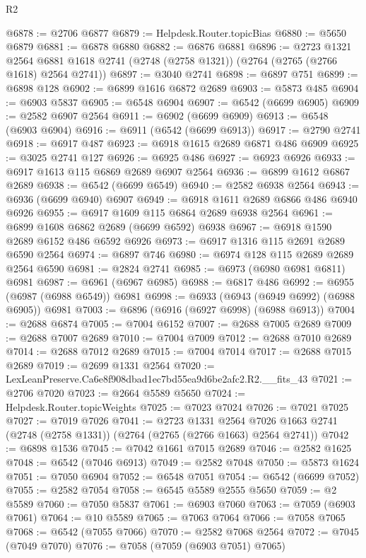 \begin{lexlean}{R2}
\begin{coremodule}
@6878 := @2706 @6877
@6879 := Helpdesk.Router.topicBias
@6880 := @5650 @6879
@6881 := @6878 @6880
@6882 := @6876 @6881
@6896 := @2723
    @1321
    @2564
    @6881
    @1618
    @2741
    (@2748 (@2758 @1321))
    (@2764 (@2765 (@2766 @1618) @2564 @2741))
@6897 := @3040 @2741
@6898 := @6897 @751
@6899 := @6898 @128
@6902 := @6899 @1616 @6872 @2689
@6903 := @5873 @485
@6904 := @6903 @5837
@6905 := @6548 @6904
@6907 := @6542 (@6699 @6905)
@6909 := @2582 @6907 @2564
@6911 := @6902 (@6699 @6909)
@6913 := @6548 (@6903 @6904)
@6916 := @6911 (@6542 (@6699 @6913))
@6917 := @2790 @2741
@6918 := @6917 @487
@6923 := @6918 @1615 @2689 @6871 @486 @6909
@6925 := @3025 @2741 @127
@6926 := @6925 @486
@6927 := @6923 @6926
@6933 := @6917 @1613 @115 @6869 @2689 @6907 @2564
@6936 := @6899 @1612 @6867 @2689
@6938 := @6542 (@6699 @6549)
@6940 := @2582 @6938 @2564
@6943 := @6936 (@6699 @6940) @6907
@6949 := @6918 @1611 @2689 @6866 @486 @6940 @6926
@6955 := @6917 @1609 @115 @6864 @2689 @6938 @2564
@6961 := @6899 @1608 @6862 @2689 (@6699 @6592) @6938
@6967 := @6918 @1590 @2689 @6152 @486 @6592 @6926
@6973 := @6917 @1316 @115 @2691 @2689 @6590 @2564
@6974 := @6897 @746
@6980 := @6974 @128 @115 @2689 @2689 @2564 @6590
@6981 := @2824 @2741
@6985 := @6973 (@6980 @6981 @6811) @6981
@6987 := @6961 (@6967 @6985)
@6988 := @6817 @486
@6992 := @6955 (@6987 (@6988 @6549)) @6981
@6998 := @6933 (@6943 (@6949 @6992) (@6988 @6905)) @6981
@7003 := @6896 (@6916 (@6927 @6998) (@6988 @6913))
@7004 := @2688 @6874
@7005 := @7004 @6152
@7007 := @2688 @7005 @2689
@7009 := @2688 @7007 @2689
@7010 := @7004 @7009
@7012 := @2688 @7010 @2689
@7014 := @2688 @7012 @2689
@7015 := @7004 @7014
@7017 := @2688 @7015 @2689
@7019 := @2699 @1331 @2564
@7020 := LexLeanPreserve.Ca6e8f908dbad1ec7bd55ea9d6be2afc2.R2.__fits_43
@7021 := @2706 @7020
@7023 := @2664 @5589 @5650
@7024 := Helpdesk.Router.topicWeights
@7025 := @7023 @7024
@7026 := @7021 @7025
@7027 := @7019 @7026
@7041 := @2723
    @1331
    @2564
    @7026
    @1663
    @2741
    (@2748 (@2758 @1331))
    (@2764 (@2765 (@2766 @1663) @2564 @2741))
@7042 := @6898 @1536
@7045 := @7042 @1661 @7015 @2689
@7046 := @2582 @1625
@7048 := @6542 (@7046 @6913)
@7049 := @2582 @7048
@7050 := @5873 @1624
@7051 := @7050 @6904
@7052 := @6548 @7051
@7054 := @6542 (@6699 @7052)
@7055 := @2582 @7054
@7058 := @6545 @5589 @2555 @5650
@7059 := @2 @5589
@7060 := @7050 @5837
@7061 := @6903 @7060
@7063 := @7059 (@6903 @7061)
@7064 := @10 @5589
@7065 := @7063 @7064
@7066 := @7058 @7065
@7068 := @6542 (@7055 @7066)
@7070 := @2582 @7068 @2564
@7072 := @7045 (@7049 @7070)
@7076 := @7058 (@7059 (@6903 @7051) @7065)

\end{coremodule}
\end{lexlean}

